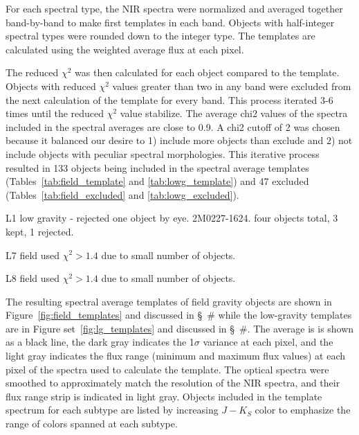 \documentclass[12pt,preprint]{aastex}
\begin{document}
For each spectral type, the NIR spectra were normalized and averaged together band-by-band to make first templates in each band. Objects with half-integer spectral types were rounded down to the integer type.
The templates are calculated using the weighted average flux at each pixel. 


The reduced $\chi^2$ was then calculated for each object compared to the template.
Objects with reduced $\chi^2$ values greater than two in any band were excluded from the next calculation of the template for every band.
This process iterated 3-6 times until the reduced $\chi^2$ value stabilize. The average chi2 values of the spectra included in the spectral averages are close to 0.9. A chi2 cutoff of 2 was chosen because it balanced our desire to 1) include more objects than exclude and 2) not include objects with peculiar spectral morphologies. 
This iterative process resulted in 133 objects being included in the spectral average templates (Tables~\ref{tab:field_template} and \ref{tab:lowg_template}) and 47 excluded (Tables~\ref{tab:field_excluded} and \ref{tab:lowg_excluded}). 


L1 low gravity - rejected one object by eye. 2M0227-1624. four objects total, 3 kept, 1 rejected. 


L7 field used $\chi^2 > 1.4$ due to small number of objects.

L8 field used $\chi^2 > 1.4$ due to small number of objects.


The resulting spectral average templates of field gravity objects are shown in Figure~\ref{fig:field_templates} and discussed in \S~\# while the low-gravity templates are in Figure set~\ref{fig:lg_templates} and discussed in \S~\#. 
The average is is shown as a black line, the dark gray indicates the 1$\sigma$ variance at each pixel, and the light gray indicates the flux range (minimum and maximum flux values) at each pixel of the spectra used to calculate the template. 
The optical spectra were smoothed to approximately match the resolution of the NIR spectra, and their flux range strip is indicated in light gray.
Objects included in the template spectrum for each subtype are listed by increasing $J-K_S$ color to emphasize the range of colors spanned at each subtype.
\end{document}
